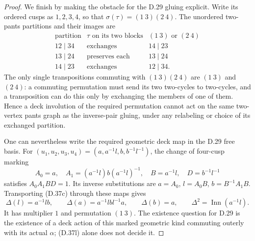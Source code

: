 \begin{proof}
We finish by making the obstacle for the D.29 gluing explicit.
Write its ordered cusps as $1,2,3,4$, so that
$\sigma(\tau)=(1\ 3)(2\ 4)$.  The unordered two-pants
partitions and their images are
\[
\begin{array}{c|c|c}
 \text{partition}&\tau\text{ on its two blocks}
                     &(1\ 3)\text{ or }(2\ 4)\\\hline
 12\mid34&\text{exchanges}&14\mid23\\
 13\mid24&\text{preserves each}&13\mid24\\
 14\mid23&\text{exchanges}&12\mid34.
\end{array}                                            \tag{D.37l}
\]
The only single transpositions commuting with
$(1\ 3)(2\ 4)$ are $(1\ 3)$ and $(2\ 4)$:
a commuting permutation must send its two two-cycles to
two-cycles, and a transposition can do this only by
exchanging the members of one of them.  Hence a deck
involution of the required permutation cannot act on the
same two-vertex pants graph as the inverse-pair gluing,
under any relabeling or choice of its exchanged partition.

One can nevertheless write the required geometric deck
map in the D.29 free basis.  For
$(u_1,u_2,u_3,u_4)=(a,a^{-1}l,b,b^{-1}l^{-1})$, the
change of four-cusp marking
\[
 A_0=a,\quad A_1=(a^{-1}l)b(a^{-1}l)^{-1},\quad
 B=a^{-1}l,\quad D=b^{-1}l^{-1}
                                                        \tag{D.37m}
\]
satisfies $A_0A_1BD=1$.  Its inverse substitutions are
$a=A_0$, $l=A_0B$, $b=B^{-1}A_1B$.
Transporting (D.37c) through these maps gives
\[
 \Delta(l)=a^{-1}lb,\qquad
 \Delta(a)=a^{-1}lbl^{-1}a,\qquad
 \Delta(b)=a,\qquad
 \Delta^2=\operatorname{Inn}(a^{-1}l).
                                                        \tag{D.37n}
\]
It has multiplier $1$ and permutation $(1\ 3)$.
The existence question for D.29 is the existence of a
deck action of this marked geometric kind commuting
outerly with its actual $\alpha$; (D.37l) alone does
not decide it.


\end{proof}

